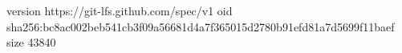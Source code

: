 version https://git-lfs.github.com/spec/v1
oid sha256:bc8ac002beb541cb3f09a56681d4a7f365015d2780b91efd81a7d5699f11baef
size 43840
